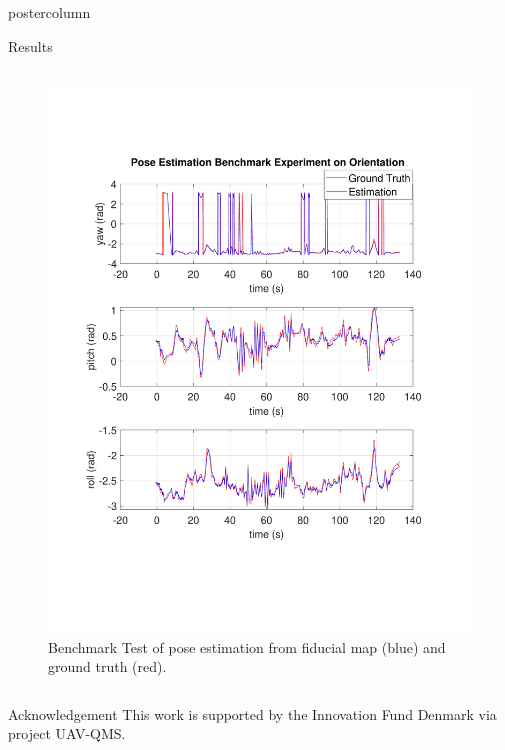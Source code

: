 \documentclass{beamer}
\begin{document}
\begin{frame}
\begin{columns}
\begin{column}{.57\textwidth}
\begin{beamercolorbox}[center]{postercolumn}
\begin{minipage}{.98\textwidth}
{\begin{myblock}{Results}
\begin{minipage}[0.3\textheight]{\textwidth}
\begin{columns}[T]
\begin{column}{0.33\textwidth}
\begin{enumerate}[label=,labelindent=\parindent,leftmargin=*]
\begin{figure}
\includegraphics[width=1.0\textwidth]{img/rpy_new}
\caption{Benchmark Test of pose estimation from fiducial map (blue) and ground truth (red).}
\label{fig:benchmark}
\end{figure}
\end{enumerate}
\end{column}

\end{columns}
\end{minipage}
\end{myblock}\vfill
\begin{myblock}{Acknowledgement}
This work is supported by the Innovation Fund Denmark via project UAV-QMS.
\end{myblock}\vfill

		}\end{minipage}\end{beamercolorbox}
	\end{column}
\end{columns}
\end{frame}
\end{document}
